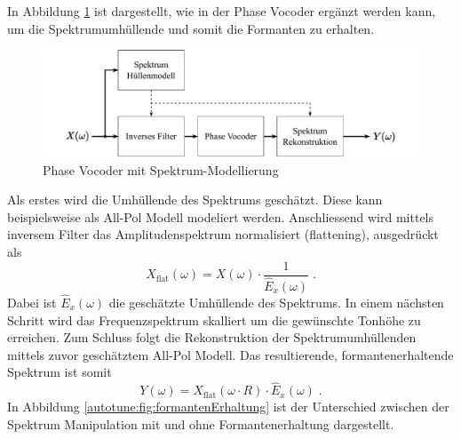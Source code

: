 In Abbildung \ref{autotune:fig:pitchShiftingSpektrumModellierung} ist dargestellt, wie in der Phase Vocoder ergänzt werden kann,
um die Spektrumumhüllende und somit die Formanten zu erhalten.
\begin{figure}
    \centering
    \includegraphics[width=\textwidth]{papers/autotune/images/Spektrum-Modellierung.pdf}
    \caption{Phase Vocoder mit Spektrum-Modellierung}
    \label{autotune:fig:pitchShiftingSpektrumModellierung}
\end{figure}
Als erstes wird die Umhüllende des Spektrums geschätzt.
Diese kann beispielsweise als All-Pol Modell modeliert werden.
Anschliessend wird mittels inversem Filter das Amplitudenspektrum normalisiert (flattening), ausgedrückt als
\begin{equation}
    X_{\text{flat}}(\omega)
    =
    X(\omega) \cdot \frac{1}{\hat{E}_x(\omega)} \;.
\end{equation}
Dabei ist $\hat{E}_x(\omega)$ die geschätzte Umhüllende des Spektrums.
In einem nächsten Schritt wird das Frequenzspektrum skalliert um die gewünschte Tonhöhe zu erreichen.
Zum Schluss folgt die Rekonstruktion der Spektrumumhüllenden mittels zuvor geschätztem All-Pol Modell.
Das resultierende, formantenerhaltende Spektrum ist somit
\begin{equation}
    Y(\omega)
    =
    X_{\text{flat}}(\omega \cdot R) \cdot \hat{E}_x(\omega) \;.
\end{equation}
In Abbildung \ref{autotune:fig:formantenErhaltung} ist der Unterschied zwischen der Spektrum Manipulation mit und ohne Formantenerhaltung dargestellt.
